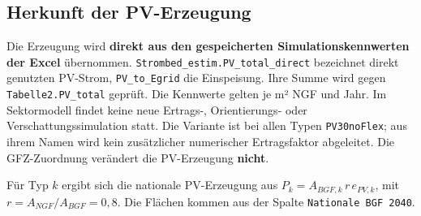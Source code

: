 \documentclass[
  ngerman,
  a4paper,
  DIV=11]{scrreprt}
\begin{document}
\subsection{Herkunft der PV-Erzeugung}\label{herkunft-der-pv-erzeugung}

Die Erzeugung wird \textbf{direkt aus den gespeicherten
Simulationskennwerten der Excel} übernommen.
\texttt{Strombed\_estim.PV\_total\_direct} bezeichnet direkt genutzten
PV-Strom, \texttt{PV\_to\_Egrid} die Einspeisung. Ihre Summe wird gegen
\texttt{Tabelle2.PV\_total} geprüft. Die Kennwerte gelten je m² NGF und
Jahr. Im Sektormodell findet keine neue Ertrags-, Orientierungs- oder
Verschattungssimulation statt. Die Variante ist bei allen Typen
\texttt{PV30\textbar{}noFlex}; aus ihrem Namen wird kein zusätzlicher
numerischer Ertragsfaktor abgeleitet. Die GFZ-Zuordnung verändert die
PV-Erzeugung \textbf{nicht}.

Für Typ \(k\) ergibt sich die nationale PV-Erzeugung aus
\(P_k=A_{BGF,k}\,r\,e_{PV,k}\), mit \(r=A_{NGF}/A_{BGF}=0{,}8\). Die
Flächen kommen aus der Spalte \texttt{Nationale\ BGF\ 2040}.
\end{document}
